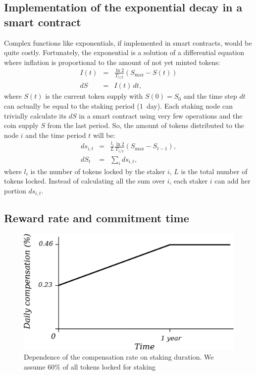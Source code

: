 \documentclass[longbibliography,nofootinbib,twocolumn]{revtex4-1}
\begin{document}
\subsection{Implementation of the exponential decay in a smart contract}

Complex functions like exponentials, if implemented in smart contracts, would be quite costly.
Fortunately, the exponential is a solution of a differential equation where inflation is proportional to the amount of not yet minted tokens:
\begin{eqnarray}
    I(t) &=& \frac{\ln{2}}{T_{1/2}} \left( S_{\max} - S(t) \right)\\
    dS &=& I(t)\, dt,
\end{eqnarray}
where $S(t)$ is the current token supply with $S(0)=S_0$ and the time step $dt$ can actually be equal to the staking period ($1$~day).
Each staking node can trivially calculate its $dS$ in a smart contract using very few operations and the coin supply $S$ from the last period.
So, the amount of tokens distributed to the node $i$ and the time period $t$ will be:
\begin{eqnarray}
    \label{eq:rate-max}
    ds_{i,t} &=& \frac{l_i}{L} \frac{\ln{2}}{T_{1/2}} \left( S_{\max} - S_{t-1} \right),\\
    dS_t &=& \sum_i ds_{i,t},
\end{eqnarray}
where $l_i$ is the number of tokens locked by the staker $i$, $L$ is the total number of tokens locked.
Instead of calculating all the sum over $i$, each staker $i$ can add her portion $ds_{i,t}$.

\subsection{Reward rate and commitment time}

\begin{figure}
    \includegraphics[width=\columnwidth]{pdf/rate.pdf}
    \caption{Dependence of the compensation rate on staking duration. We assume $60\%$ of all tokens locked for staking}
    \label{fig:reward-rate-vs-duration}
\end{figure}
\end{document}
